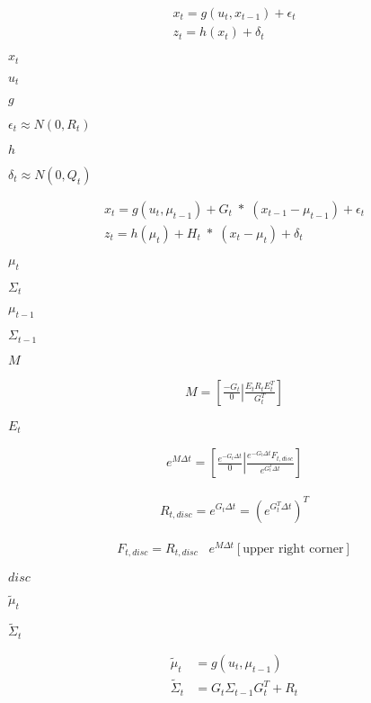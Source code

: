 \documentclass{article}
\begin{document}
\begin{align} x_t = g(u_t, x_{t-1}) + \epsilon_t \\ z_t = h(x_t) + \delta_t \end{align}
\pagebreak

$ x_t $
\pagebreak

$ u_t $
\pagebreak

$ g $
\pagebreak

$ \epsilon_t \approx N(0, R_t) $
\pagebreak

$ h $
\pagebreak

$ \delta_t \approx N(0, Q_t) $
\pagebreak

\begin{align} x_t = g(u_t, \mu_{t-1}) + G_t \; * \; (x_{t-1} - \mu_{t-1}) + \epsilon_t \\ z_t = h(\mu_t) + H_t \; * \; (x_{t} - \mu_{t}) + \delta_t \end{align}
\pagebreak

$ \mu_{t} $
\pagebreak

$ \Sigma_t $
\pagebreak

$ \mu_{t-1} $
\pagebreak

$ \Sigma_{t-1} $
\pagebreak

$ M $
\pagebreak

\begin{align} M = \left[ \left. \frac{-G_t}{0} \right| \frac{E_t R_t E_t^T}{G_t^T} \right] \end{align}
\pagebreak

$ E_t $
\pagebreak

\begin{align} e^{M \Delta t} = \left[ \left. \frac{ e^{-G_t \Delta t} }{0} \right| \frac{ e^{-G_t \Delta t} F_{t, disc} }{ e^{G_t^T \Delta t} } \right] \end{align}
\pagebreak

\begin{align} R_{t, disc} = e^{G_t \Delta t} = (e^{G_t^T \Delta t})^T \end{align}
\pagebreak

\begin{align} F_{t, disc} = R_{t, disc} \;\;\; e^{M \Delta t}[\text{upper right corner}] \end{align}
\pagebreak

$ {disc} $
\pagebreak

$ \tilde{\mu}_{t} $
\pagebreak

$ \tilde{\Sigma}_{t} $
\pagebreak

\begin{align} \tilde{\mu}_{t} &= g(u_t, \mu_{t-1}) \\ \tilde{\Sigma}_{t} &= G_t \Sigma_{t-1} G_t^T + R_t \end{align}
\pagebreak
\end{document}
